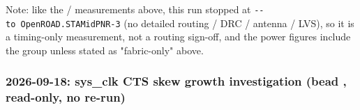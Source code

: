 \begin{record}
Note: like the / measurements above, this run
stopped at
\texttt{-\allowbreak{}-\allowbreak{}to\ OpenROAD.\allowbreak{}STAMidPNR-\allowbreak{}3}
(no detailed routing / DRC / antenna / LVS), so it is a timing-only
measurement, not a routing sign-off, and the power figures include the
 group unless stated as "fabric-only" above.

\end{record}

\subsubsection{\texorpdfstring{2026-09-18: sys\_clk CTS skew growth
investigation (bead , read-only, no
re-run)}{2026-09-18: sys\_clk CTS skew growth investigation (bead , read-only, no re-run)}}\label{cr:run:phase5:2026-09-18-sys-clk-cts-skew-growth-investigation-bead-ea0-read-only-no-re-run}

